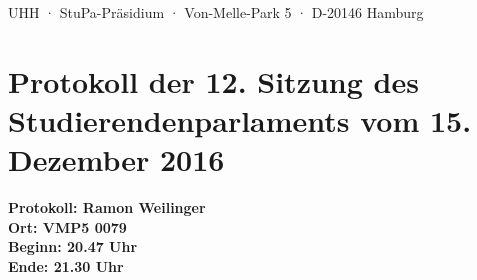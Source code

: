 \documentclass[ngerman,headheight=70pt]{scrartcl}
\begin{document}
    UHH · StuPa-Präsidium · Von-Melle-Park 5 · D-20146 Hamburg

    \section*{Protokoll der 12. Sitzung des Studierendenparlaments vom 15. Dezember 2016}

    \textbf{Protokoll: Ramon Weilinger}\\
    \textbf{Ort: VMP5 0079}\\
    \textbf{Beginn: 20.47 Uhr}\\
    \textbf{Ende: 21.30 Uhr}

    \vspace{0.5cm}
\end{document}
